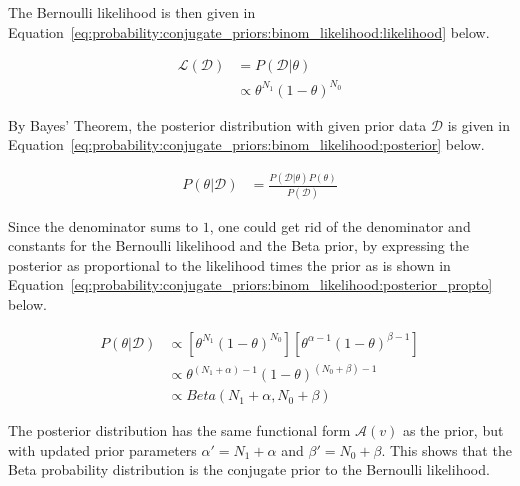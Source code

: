 \noindent
The Bernoulli likelihood is then given in Equation~\eqref{eq:probability:conjugate_priors:binom_likelihood:likelihood} below.

\begin{equation}
      \label{eq:probability:conjugate_priors:binom_likelihood:likelihood}
      \begin{split}
            \mathcal{L}(\mathcal{D}) &=  P(\mathcal{D} | \theta) \\
            &\propto \theta^{N_{1}}(1-\theta)^{N_{0}}
      \end{split}
\end{equation}

\noindent
By Bayes' Theorem, the posterior distribution with given prior data $\mathcal{D}$ is given in Equation~\eqref{eq:probability:conjugate_priors:binom_likelihood:posterior} below.

\begin{equation}
      \begin{split}
            \label{eq:probability:conjugate_priors:binom_likelihood:posterior}
            P(\theta \vert \mathcal{D}) &= \frac{P(\mathcal{D} | \theta) P(\theta)}{P(\mathcal{D})}
      \end{split}
\end{equation}

\noindent
Since the denominator sums to $1$, one could get rid of the denominator and constants for the Bernoulli likelihood and the Beta prior, by expressing the posterior as proportional to the likelihood times the prior as is shown in Equation~\eqref{eq:probability:conjugate_priors:binom_likelihood:posterior_propto} below.

\begin{equation}
      \label{eq:probability:conjugate_priors:binom_likelihood:posterior_propto}
      \begin{split}
            P(\theta | \mathcal{D}) &\propto \left[\theta^{N_{1}}(1-\theta)^{N_{0}}\right] \left[\theta^{\alpha - 1} (1 - \theta)^{\beta - 1}\right] \\
            &\propto \theta^{(N_{1} + \alpha) - 1}(1-\theta)^{(N_{0} + \beta) - 1} \\
            &\propto Beta(N_{1} + \alpha, N_{0} + \beta)
      \end{split}
\end{equation}

\noindent
The posterior distribution has the same functional form $\mathcal{A}(v)$ as the prior, but with updated prior parameters $\alpha' = N_{1} + \alpha$ and $\beta' = N_{0} + \beta$. This shows that the Beta probability distribution is the conjugate prior to the Bernoulli likelihood.


